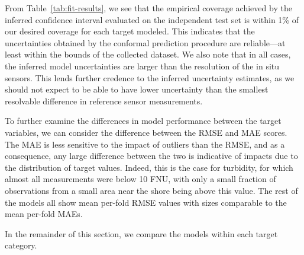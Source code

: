 \clearpage
\newpage



From Table~\ref{tab:fit-results},  we see that the empirical coverage achieved
by the inferred confidence interval evaluated on the independent test set is
within 1\% of our desired coverage for each target modeled. This indicates that
the uncertainties obtained by the conformal prediction procedure are
reliable---at least within the bounds of the collected dataset. We also note
that in all cases, the inferred model uncertainties are larger than the
resolution of the in situ sensors. This lends further credence to the inferred
uncertainty estimates, as we should not expect to be able to have lower
uncertainty than the smallest resolvable difference in reference sensor
measurements.

To further examine the differences in model performance between the target
variables, we can consider the difference between the RMSE and MAE scores. The
MAE is less sensitive to the impact of outliers than the RMSE, and as a
consequence, any large difference between the two is indicative of impacts due
to the distribution of target values. Indeed, this is the case for turbidity,
for which almost all measurements were below 10 FNU, with only a small fraction
of observations from a small area near the shore being above this value. %
The rest of the models all show mean per-fold RMSE values with sizes comparable
to the mean per-fold MAEs.

In the remainder of this section, we compare the models within each target
category.

\clearpage
\newpage

